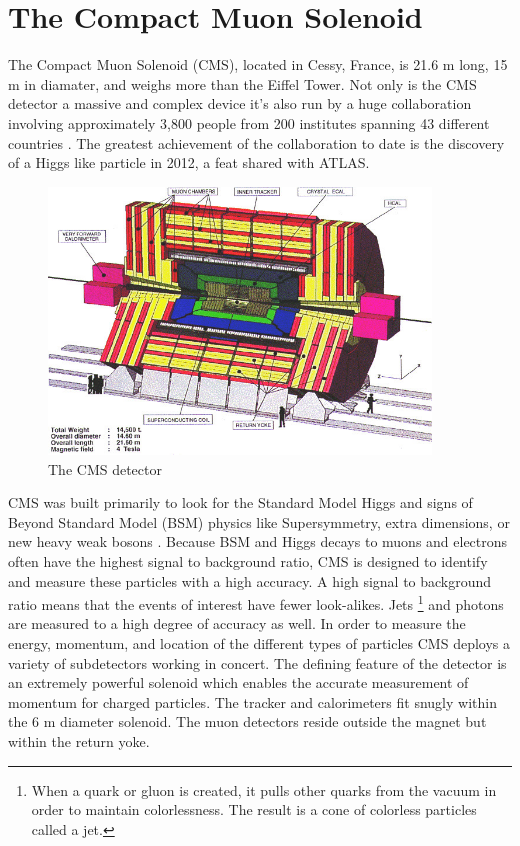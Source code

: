 \section{The Compact Muon Solenoid}

The Compact Muon Solenoid (CMS), located in Cessy, France, is 21.6 m long, 15 m in diamater, and weighs more than the Eiffel Tower. Not only is the CMS detector a massive and complex device it's also run by a huge collaboration involving approximately 3,800 people from 200 institutes spanning 43 different countries \cite{cmscollab}. The greatest achievement of the collaboration to date is the discovery of a Higgs like particle in 2012, a feat shared with ATLAS.

\begin{figure}[h!]
  \centering
  \includegraphics[width=4in]{images/CMSdetc3D.jpg}
  \caption[The CMS detector.]
   {The CMS detector \cite{cmsweb}}
  \label{fig:cmsdet3d}
\end{figure}

CMS was built primarily to look for the Standard Model Higgs and signs of Beyond Standard Model (BSM) physics like Supersymmetry, extra dimensions, or new heavy weak bosons \cite{tdr}. Because BSM and Higgs decays to muons and electrons often have the highest signal to background ratio, CMS is designed to identify and measure these particles with a high accuracy. A high signal to background ratio means that the events of interest have fewer look-alikes. Jets \footnote{When a quark or gluon is created, it pulls other quarks from the vacuum in order to maintain colorlessness. The result is a cone of colorless particles called a jet.} and photons are measured to a high degree of accuracy as well. In order to measure the energy, momentum, and location of the different types of particles CMS deploys a variety of subdetectors working in concert. The defining feature of the detector is an extremely powerful solenoid which enables the accurate measurement of momentum for charged particles. The tracker and calorimeters fit snugly within the 6 m diameter solenoid. The muon detectors reside outside the magnet but within the return yoke.

